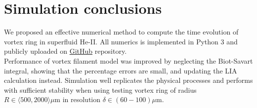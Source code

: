 \section{Simulation conclusions}

We proposed an effective numerical method to compute the time evolution of vortex ring in superfluid He-II. All numerics is implemented in Python 3 and publicly uploaded on \href{https://github.com/KuboBahyl/superfluid}{GitHub} repository.\\
Performance of vortex filament model was improved by neglecting the Biot-Savart integral, showing that the percentage errors are small, and updating the LIA calculation instead. Simulation well replicates the physical processes and performs with sufficient stability when using testing vortex ring of radius $R \in \langle 500, 2000 \rangle \mu\text{m}$ in resolution $\delta \in (60 - 100) \mu\text{m}$.


\newpage

